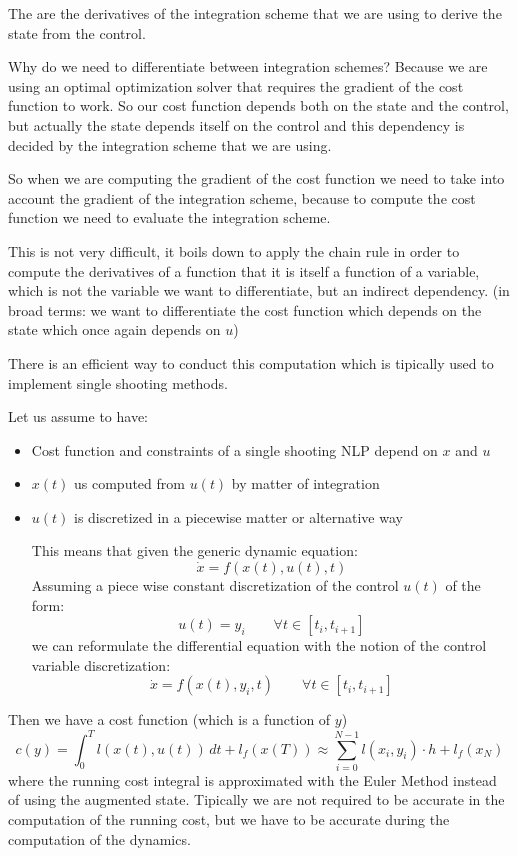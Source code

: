 The  are the derivatives of the integration scheme that we are using to derive the state from the control.

Why do we need to differentiate between integration schemes? Because we are using an optimal optimization solver that requires the gradient of the cost function to work. So our cost function depends both on the state and the control, but actually the state depends itself on the control and this dependency is decided by the integration scheme that we are using.

So when we are computing the gradient of the cost function we need to take into account the gradient of the integration scheme, because to compute the cost function we need to evaluate the integration scheme.

This is not very difficult, it boils down to apply the chain rule in order to compute the derivatives of a function that it is itself a function of a variable, which is not the variable we want to differentiate, but an indirect dependency.
(in broad terms: we want to differentiate the cost function which depends on the state which once again depends on $u$)

There is an efficient way to conduct this computation which is tipically used to implement single shooting methods.\newline

Let us assume to have:
\begin{itemize}
\item Cost function and constraints of a single shooting NLP depend on $x$ and $u$
\item $x(t)$ us computed from $u(t)$ by matter of integration
\item $u(t)$ is discretized in a piecewise matter or alternative way

This means that given the generic dynamic equation:
\[\dot{x} =  f(x(t), u(t), t)\]
Assuming a piece wise constant discretization of the control $u(t)$ of the form:
\[u(t) = y_i\qquad\forall t \in [t_i, t_{i+1}]\]
we can reformulate the differential equation with the notion of the control variable discretization:
\[\dot{x} = f(x(t), y_i, t)\qquad\forall t \in [t_i, t_{i+1}]\]
\end{itemize}

Then we have a cost function (which is a function of $y$)
\[c(y) = \int_0^T l(x(t), u(t))\,dt + l_f(x(T))  \approx \sum_{i=0}^{N-1} l(x_i, y_i)\cdot h + l_f(x_N)\]
where the running cost integral is approximated with the Euler Method instead of using the augmented state. Tipically we are not required to be accurate in the computation of the running cost, but we have to be accurate during the computation of the dynamics.

